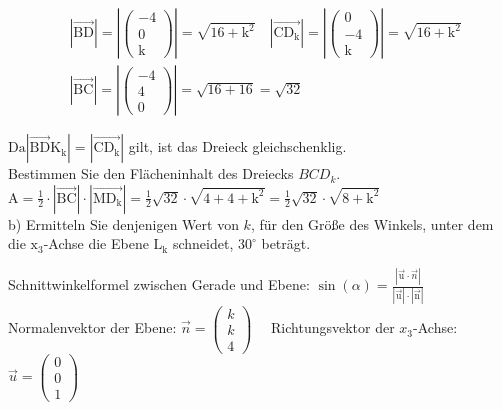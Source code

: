 \documentclass[10pt]{article}
\begin{document}
$$
\begin{aligned}
& |\overrightarrow{\mathrm{BD}}|=\left|\left(\begin{array}{c}
-4 \\
0 \\
\mathrm{k}
\end{array}\right)\right|=\sqrt{16+\mathrm{k}^{2}} \quad\left|\overrightarrow{\mathrm{CD}_{\mathrm{k}}}\right|=\left|\left(\begin{array}{c}
0 \\
-4 \\
\mathrm{k}
\end{array}\right)\right|=\sqrt{16+\mathrm{k}^{2}} \\
& |\overrightarrow{\mathrm{BC}}|=\left|\left(\begin{array}{c}
-4 \\
4 \\
0
\end{array}\right)\right|=\sqrt{16+16}=\sqrt{32}
\end{aligned}
$$

$\mathrm{Da}\left|\overrightarrow{\mathrm{BD}} \mathrm{K}_{\mathrm{k}}\right|=\left|\overrightarrow{\mathrm{CD}_{\mathrm{k}}}\right|$ gilt, ist das Dreieck gleichschenklig.\\
Bestimmen Sie den Flächeninhalt des Dreiecks $B C D_{k}$.\\
$\mathrm{A}=\frac{1}{2} \cdot|\overrightarrow{\mathrm{BC}}| \cdot\left|\overrightarrow{\mathrm{MD}_{\mathrm{k}}}\right|=\frac{1}{2} \sqrt{32} \cdot \sqrt{4+4+\mathrm{k}^{2}}=\frac{1}{2} \sqrt{32} \cdot \sqrt{8+\mathrm{k}^{2}}$\\
b) Ermitteln Sie denjenigen Wert von $k$, für den Größe des Winkels, unter dem die $\mathrm{x}_{3}$-Achse die Ebene $\mathrm{L}_{\mathrm{k}}$ schneidet, $30^{\circ}$ beträgt.

Schnittwinkelformel zwischen Gerade und Ebene: $\sin (\alpha)=\frac{|\overrightarrow{\mathrm{u}} \cdot \vec{n}|}{|\overrightarrow{\mathrm{u}}| \cdot|\overrightarrow{\mathrm{n}}|}$ Normalenvektor der Ebene: $\vec{n}=\left(\begin{array}{l}k \\ k \\ 4\end{array}\right) \quad$ Richtungsvektor der $x_{3}$-Achse: $\vec{u}=\left(\begin{array}{l}0 \\ 0 \\ 1\end{array}\right)$
\end{document}
